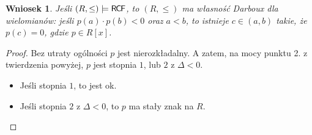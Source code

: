 \documentclass{article}
\theoremstyle{plain}
\newtheorem{wn}[thm]{Wniosek}
\theoremstyle{definition}
\theoremstyle{remark}
\newcommand{\RCF}{\mathsf{R \mkern-1.7mu C \mkern-1.4mu F}}
\begin{document}
\begin{wn}
	Jeśli $ (R, \leq) \models \RCF $, to $ (R, \leq) $ ma własność Darboux dla wielomianów:
	jeśli $ p(a) \cdot p(b) < 0 $ oraz $ a <b $, to istnieje $c \in (a, b) $ takie, że $ p(c) = 0 $, gdzie $ p \in R[x] $.
\end{wn}
\begin{proof}
	 Bez utraty ogólności $ p $ jest nierozkładalny.
	 A zatem, na mocy punktu 2. z twierdzenia powyżej, $ p $ jest stopnia $ 1 $, lub $ 2 $ z $ \Delta < 0$.
	 \begin{itemize}
		 \item Jeśli stopnia $ 1 $, to jest ok.
		 \item Jeśli stopnia $2$ z $\Delta < 0 $, to $ p $ ma stały znak na $ R $.
	 \end{itemize}

\end{proof}
\end{document}
